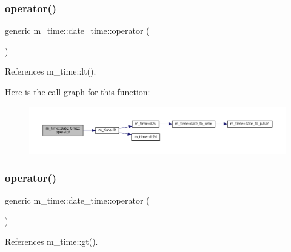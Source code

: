 \subsubsection{\texorpdfstring{operator()}{operator()}\hspace{0.1cm}{\footnotesize\ttfamily [3/9]}}
{\footnotesize\ttfamily generic m\+\_\+time\+::date\+\_\+time\+::operator (\begin{DoxyParamCaption}{ }\end{DoxyParamCaption})\hspace{0.3cm}{\ttfamily [private]}}



References m\+\_\+time\+::lt().

Here is the call graph for this function\+:\nopagebreak
\begin{figure}[H]
\begin{center}
\leavevmode
\includegraphics[width=350pt]{structm__time_1_1date__time_afd5a2b9837bc8d48eb244bd07c200c6a_cgraph}
\end{center}
\end{figure}
\mbox{\label{structm__time_1_1date__time_a1aa01f75ae1f67a4b3202febd56b462f}} 
\subsubsection{\texorpdfstring{operator()}{operator()}\hspace{0.1cm}{\footnotesize\ttfamily [4/9]}}
{\footnotesize\ttfamily generic m\+\_\+time\+::date\+\_\+time\+::operator (\begin{DoxyParamCaption}{ }\end{DoxyParamCaption})\hspace{0.3cm}{\ttfamily [private]}}



References m\+\_\+time\+::gt().

